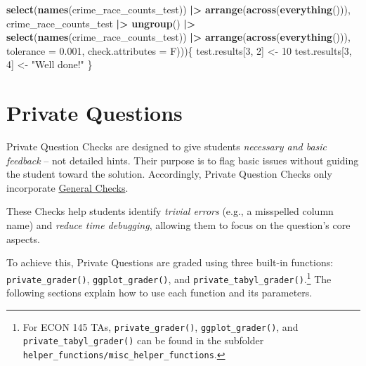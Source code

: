 \documentclass[
  12pt,
]{book}
\newenvironment{Shaded}{\begin{snugshade}}{\end{snugshade}}
\newcommand{\AttributeTok}[1]{\textcolor[rgb]{0.13,0.29,0.53}{#1}}
\newcommand{\DecValTok}[1]{\textcolor[rgb]{0.00,0.00,0.81}{#1}}
\newcommand{\FloatTok}[1]{\textcolor[rgb]{0.00,0.00,0.81}{#1}}
\newcommand{\FunctionTok}[1]{\textcolor[rgb]{0.13,0.29,0.53}{\textbf{#1}}}
\newcommand{\NormalTok}[1]{#1}
\newcommand{\OtherTok}[1]{\textcolor[rgb]{0.56,0.35,0.01}{#1}}
\newcommand{\SpecialCharTok}[1]{\textcolor[rgb]{0.81,0.36,0.00}{\textbf{#1}}}
\newcommand{\StringTok}[1]{\textcolor[rgb]{0.31,0.60,0.02}{#1}}
\begin{document}
\begin{Shaded}
\begin{Highlighting}[]
                           \FunctionTok{select}\NormalTok{(}\FunctionTok{names}\NormalTok{(crime\_race\_counts\_test)) }\SpecialCharTok{|\textgreater{}}
                           \FunctionTok{arrange}\NormalTok{(}\FunctionTok{across}\NormalTok{(}\FunctionTok{everything}\NormalTok{())),}
\NormalTok{                           crime\_race\_counts\_test }\SpecialCharTok{|\textgreater{}} \FunctionTok{ungroup}\NormalTok{() }\SpecialCharTok{|\textgreater{}}
                           \FunctionTok{select}\NormalTok{(}\FunctionTok{names}\NormalTok{(crime\_race\_counts\_test)) }\SpecialCharTok{|\textgreater{}}
                           \FunctionTok{arrange}\NormalTok{(}\FunctionTok{across}\NormalTok{(}\FunctionTok{everything}\NormalTok{())),}
                           \AttributeTok{tolerance =} \FloatTok{0.001}\NormalTok{,}
                           \AttributeTok{check.attributes =}\NormalTok{ F)))\{}
\NormalTok{    test.results[}\DecValTok{3}\NormalTok{, }\DecValTok{2}\NormalTok{] }\OtherTok{\textless{}{-}} \DecValTok{10}
\NormalTok{    test.results[}\DecValTok{3}\NormalTok{, }\DecValTok{4}\NormalTok{] }\OtherTok{\textless{}{-}} \StringTok{"Well done!"}
\NormalTok{\}  }
\end{Highlighting}
\end{Shaded}

\chapter{Private Questions}\label{Private-Questions}

Private Question Checks are designed to give students \emph{necessary and basic feedback} -- not detailed hints. Their purpose is to flag basic issues without guiding the student toward the solution. Accordingly, Private Question Checks only incorporate \hyperref[General-Checks]{General Checks}.

These Checks help students identify \emph{trivial errors} (e.g., a misspelled column name) and \emph{reduce time debugging}, allowing them to focus on the question's core aspects.

To achieve this, Private Questions are graded using three built-in functions: \texttt{private\_grader()}, \texttt{ggplot\_grader()}, and \texttt{private\_tabyl\_grader()}.\footnote{For ECON 145 TAs, \texttt{private\_grader()}, \texttt{ggplot\_grader()}, and \texttt{private\_tabyl\_grader()} can be found in the subfolder \texttt{helper\_functions/misc\_helper\_functions}.} The following sections explain how to use each function and its parameters.
\end{document}
